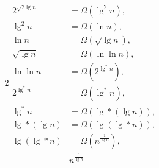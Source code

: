 \begin{alignat*}{2}
\begin{aligned}
		2^{\sqrt{2 \lg n}} &= \Omega \left(\lg ^2 n \right), \\
		\lg ^2 n &= \Omega \left(\ln n \right), \\
		\ln n &= \Omega \left(\sqrt{\lg n} \right), \\
		\sqrt{\lg n} &= \Omega \left(\ln \ln n \right), \\
		\ln \ln n &= \Omega \left(2^{\lg ^* n} \right), \\
		2^{\lg ^* n} &= \Omega \left(\lg ^* n \right), \\
		\lg ^* n &= \Omega \left(\lg * (\lg n) \right), \\
		\lg * (\lg n) &= \Omega \left(\lg (\lg * n) \right), \\
		\lg (\lg * n) &= \Omega \left(n^{\frac{1}{\lg n}} \right), \\
		& n^{\frac{1}{\lg n}}
	\end{aligned}
\end{alignat*}

